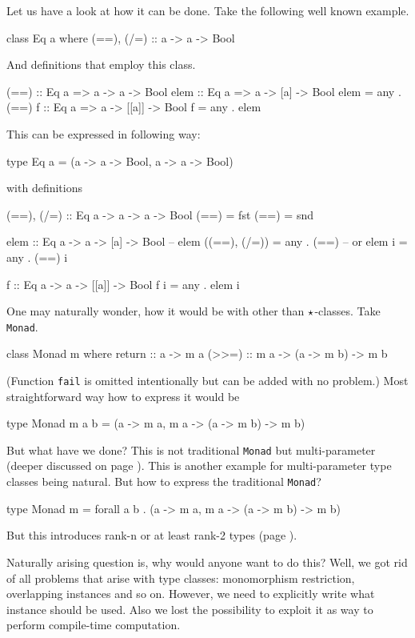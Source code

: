 \documentclass[11pt,oneside,draft]{fithesis2}
\theoremstyle{definition}
\begin{document}
Let us have a look at how it can be done. Take the following well known example.
\begin{code}
class Eq a where
    (==), (/=) :: a -> a -> Bool
\end{code}
And definitions that employ this class.
\begin{code}
(==) :: Eq a => a -> a -> Bool
elem :: Eq a => a -> [a] -> Bool
elem = any . (==)
f :: Eq a => a -> [[a]] -> Bool
f = any . elem
\end{code}
This can be expressed in following way:
\begin{code}
type Eq a = (a -> a -> Bool, a -> a -> Bool)
\end{code}
with definitions
\begin{code}
(==), (/=) :: Eq a -> a -> a -> Bool
(==) = fst
(==) = snd

elem :: Eq a -> a -> [a] -> Bool
-- elem ((==), (/=)) = any . (==)
-- or
elem i = any . (==) i

f :: Eq a -> a -> [[a]] -> Bool
f i = any . elem i
\end{code}

One may naturally wonder, how it would be with other than \({\star}\)-classes.
Take \texttt{Monad}.
\begin{code}
class Monad m where
	return :: a -> m a
	(>>=) :: m a -> (a -> m b) -> m b
\end{code}
(Function \texttt{fail} is omitted intentionally but can be added with
no problem.)
Most straightforward way how to express it would be
\begin{code}
type Monad m a b = (a -> m a, m a -> (a -> m b) -> m b)
\end{code}
But what have we done? This is not traditional \texttt{Monad}
but multi-parameter (deeper discussed on page
\pageref{extension:multiparam}). This is another example for
multi-parameter type classes being natural. But how to express the
traditional \texttt{Monad}?
\begin{code}
type Monad m = forall a b . (a -> m a, m a -> (a -> m b) -> m b)
\end{code}
But this introduces rank-n or at least rank-2 types (page
\pageref{extension:rankn}).

Naturally arising question is, why would anyone want to do this?
Well, we got rid of all problems that arise with type classes:
monomorphism restriction, overlapping instances and so on.
However, we need to explicitly write what instance should be used.
Also we lost the possibility
to exploit it as way to perform compile-time computation.
\end{document}
